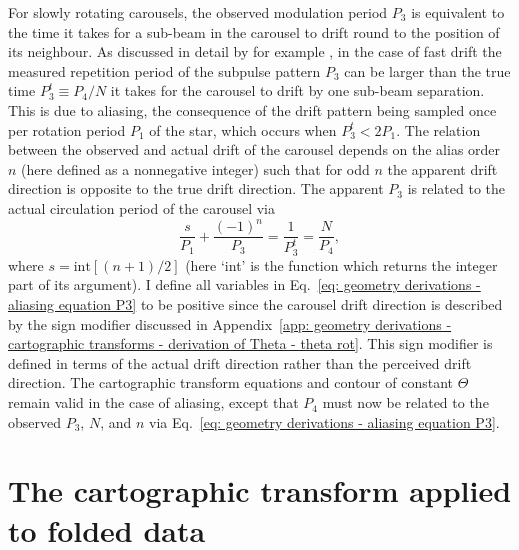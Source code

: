 For slowly rotating carousels, the observed modulation period $P_3$ is equivalent to the time it takes for a sub-beam in the carousel to drift round to the position of its neighbour. As discussed in detail by for example \citet{GGKS2004}, in the case of fast drift the measured repetition period of the subpulse pattern $P_3$ can be larger than the true time $P_3^t \equiv P_4/N$ it takes for the carousel to drift by one sub-beam separation. This is due to aliasing, the consequence of the drift pattern being sampled once per rotation period $P_1$ of the star, which occurs when $P_3^t < 2P_1$. The relation between the observed and actual drift of the carousel depends on the alias order $n$ (here defined as a nonnegative integer) such that for odd $n$ the apparent drift direction is opposite to the true drift direction. The apparent $P_3$ is related to the actual circulation period of the carousel via
\begin{equation}
    \label{eq: geometry derivations - aliasing equation P3}
    \frac{s}{P_1} + \frac{(-1)^n}{P_3} = \frac{1}{P_3^t} = \frac{N}{P_4},
\end{equation}
where $s = \text{int}[(n+1)/2]$ (here `int' is the function which returns the integer part of its argument). I define all variables in Eq.~\eqref{eq: geometry derivations - aliasing equation P3} to be positive since the carousel drift direction is described by the sign modifier discussed in Appendix~\ref{app: geometry derivations - cartographic transforms - derivation of Theta - theta rot}. This sign modifier is defined in terms of the actual drift direction rather than the perceived drift direction. The cartographic transform equations and contour of constant $\Theta$ remain valid in the case of aliasing, except that $P_4$ must now be related to the observed $P_3$, $N$, and $n$ via Eq.~\eqref{eq: geometry derivations - aliasing equation P3}. 





























\section{The cartographic transform applied to folded data}
\label{app: geometry derivations - P3 fold}

